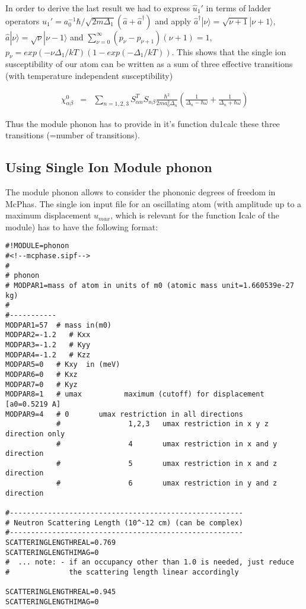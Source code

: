 In order to derive the last result we had to express $\hat u_1'$ in terms of ladder  operators
$\hat u_1'=a_0^{-1} \hbar/\sqrt{2m\Delta_1}(\hat a+\hat a^{\dagger})$ and  apply $\hat a^{\dagger}|\nu\rangle=\sqrt{\nu+1}|\nu+1\rangle$,
$\hat a|\nu\rangle=\sqrt{\nu}|\nu-1\rangle$ and $\sum_{\nu=0}^{\infty}(p_{\nu}-p_{\nu+1})(\nu+1)=1$,
$p_{\nu}=exp(-\nu\Delta_1/kT)(1-exp(-\Delta_1/kT))$. This shows that the single ion susceptibility
of our atom can be written as a sum of three effective transitions (with temperature independent
susceptibility)

\begin{eqnarray}
\chi^0_{\alpha\beta}
&=& \sum_{n=1,2,3} S^T_{\alpha n}S_{n\beta}\frac{\hbar^2}{2ma_0^2\Delta_n}
\left(\frac{1}{\Delta_n-\hbar\omega}+\frac{1}{\Delta_n+\hbar\omega}\right )
\end{eqnarray}

Thus the module {\prg phonon} has to provide in it's function {\prg du1calc} these three
transitions (=number of transitions).

\subsection{Using Single Ion Module {\prg phonon}}

The module {\prg phonon} allows to consider the phononic degrees of freedom in McPhas.
The single ion input file for an oscillating atom (with amplitude 
up to a maximum displacement $u_{max}$, which is relevant for the function {\prg Icalc} of the
module) has to have the following format:

\begin{verbatim}
#!MODULE=phonon
#<!--mcphase.sipf-->
#
# phonon
# MODPAR1=mass of atom in units of m0 (atomic mass unit=1.660539e-27 kg)
#
#-----------
MODPAR1=57  # mass in(m0)
MODPAR2=-1.2   # Kxx
MODPAR3=-1.2   # Kyy
MODPAR4=-1.2   # Kzz
MODPAR5=0   # Kxy  in (meV)
MODPAR6=0   # Kxz
MODPAR7=0   # Kyz
MODPAR8=1   # umax          maximum (cutoff) for displacement [a0=0.5219 A]
MODPAR9=4   # 0       umax restriction in all directions
            #                1,2,3   umax restriction in x y z direction only
            #                4       umax restriction in x and y direction
            #                5       umax restriction in x and z direction
            #                6       umax restriction in y and z direction

#-------------------------------------------------------
# Neutron Scattering Length (10^-12 cm) (can be complex)
#-------------------------------------------------------
SCATTERINGLENGTHREAL=0.769
SCATTERINGLENGTHIMAG=0
#  ... note: - if an occupancy other than 1.0 is needed, just reduce 
#              the scattering length linear accordingly

SCATTERINGLENGTHREAL=0.945
SCATTERINGLENGTHIMAG=0
\end{verbatim}

